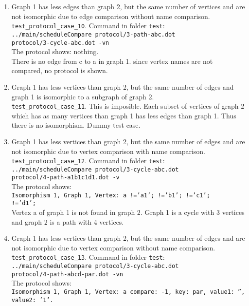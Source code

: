 \documentclass[12pt,a4paper]{report}
\begin{document}
\begin{enumerate}
  \item Graph 1 has less edges than graph 2, but the same number of vertices and are not isomorphic due to edge comparison without name comparison.
    \texttt{test\_protocol\_case\_10}. Command in folder \texttt{test}: \\
    \texttt{../main/scheduleCompare protocol/3-path-abc.dot \\ protocol/3-cycle-abc.dot -vn} \\
    The protocol shows: nothing. \\
    There is no edge from c to a in graph 1. since vertex names are not compared, no protocol is shown.

  \item Graph 1 has less vertices than graph 2, but the same number of edges and graph 1 is isomorphic to a subgraph of graph 2. \\
    \texttt{test\_protocol\_case\_11}. 
    This is imposible. Each subset of vertices of graph 2 which has as many vertices than graph 1 has less edges than graph 1.
    Thus there is no isomorphism.
    Dummy test case.
  \item Graph 1 has less vertices than graph 2, but the same number of edges and are not isomorphic due to vertex comparison with name comparison.
    \texttt{test\_protocol\_case\_12}. Command in folder \texttt{test}: \\
    \texttt{../main/scheduleCompare protocol/3-cycle-abc.dot \\ protocol/4-path-a1b1c1d1.dot -v} \\
    The protocol shows: \\
    \texttt{Isomorphism 1, Graph 1, Vertex: a !='a1'; !='b1'; !='c1'; \\ !='d1';} \\
    Vertex a of graph 1 is not found in graph 2.
    Graph 1 is a cycle with 3 vertices and graph 2 is a path with 4 vertices.
  \item Graph 1 has less vertices than graph 2, but the same number of edges and are not isomorphic due to vertex comparison without name comparison.
    \texttt{test\_protocol\_case\_13}. Command in folder \texttt{test}: \\
    \texttt{../main/scheduleCompare protocol/3-cycle-abc.dot \\ protocol/4-path-abcd-par.dot -vn} \\
    The protocol shows: \\
    \texttt{Isomorphism 1, Graph 1, Vertex: a compare: -1, key: par, value1: '', value2: '1'. \\
}
\end{enumerate}
\end{document}
